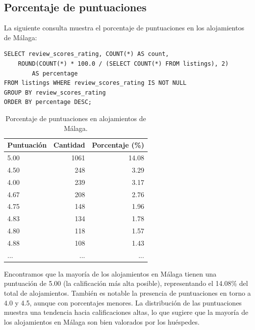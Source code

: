 \subsection{Porcentaje de puntuaciones}
La siguiente consulta muestra el porcentaje de puntuaciones en los alojamientos de Málaga:
\begin{verbatim}
SELECT review_scores_rating, COUNT(*) AS count, 
    ROUND(COUNT(*) * 100.0 / (SELECT COUNT(*) FROM listings), 2) 
        AS percentage
FROM listings WHERE review_scores_rating IS NOT NULL
GROUP BY review_scores_rating
ORDER BY percentage DESC;
\end{verbatim}
\begin{table}[h]
\centering
\begin{tabular}{|l|r|r|}
\hline
\textbf{Puntuación} & \textbf{Cantidad} & \textbf{Porcentaje (\%)} \\ \hline
5.00 & 1061 & 14.08 \\ \hline
4.50 & 248 & 3.29 \\ \hline
4.00 & 239 & 3.17 \\ \hline
4.67 & 208 & 2.76 \\ \hline
4.75 & 148 & 1.96 \\ \hline
4.83 & 134 & 1.78 \\ \hline
4.80 & 118 & 1.57 \\ \hline
4.88 & 108 & 1.43 \\ \hline
... & ... & ... \\ \hline
\end{tabular}
\caption{Porcentaje de puntuaciones en alojamientos de Málaga.}
\end{table}

Encontramos que la mayoría de los alojamientos en Málaga tienen una puntuación de 5.00 (la calificación más alta posible), representando el 14.08\% del total de alojamientos. También es notable la presencia de puntuaciones en torno a 4.0 y 4.5, aunque con porcentajes menores. La distribución de las puntuaciones muestra una tendencia hacia calificaciones altas, lo que sugiere que la mayoría de los alojamientos en Málaga son bien valorados por los huéspedes.

